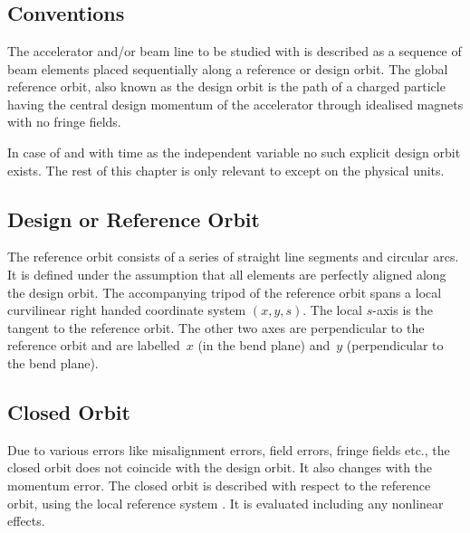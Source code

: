 %
%





\chapter{\opalmap} \label{sec:SplitOperatorMethods}


\section{\opalmap Conventions}

\label{chp:definitions}
The accelerator and/or beam line to be studied with \opalmap is described as
a sequence of beam elements placed sequentially along a reference or
design orbit.
The global reference orbit, also known as the design orbit 
is the path of a charged particle having the central design momentum
of the accelerator through idealised magnets with no fringe fields.

In case of \opalt and \opalcycl with time as the independent variable no such
explicit design orbit exists. The rest of this chapter is only relevant to
\opalmap except  on the physical units.


\section{Design or Reference Orbit}
The reference orbit consists of a series of
straight line segments and circular arcs.
It is defined under the assumption that all elements are
perfectly aligned along the design orbit.
The accompanying tripod of the reference orbit spans
a local curvilinear right handed coordinate system $(x,y,s)$.
The local $s$-axis is the tangent to the reference orbit.
The other two axes are perpendicular to the reference orbit and
are labelled~$x$ (in the bend plane)
and~$y$ (perpendicular to the bend plane).

\section{Closed Orbit}
Due to various errors like misalignment errors, field errors,
fringe fields etc.,
the closed orbit does not coincide with the design orbit.
It also changes with the momentum error.
The closed orbit is described with respect to the reference orbit,
using the local reference system .
It is evaluated including any nonlinear effects.

